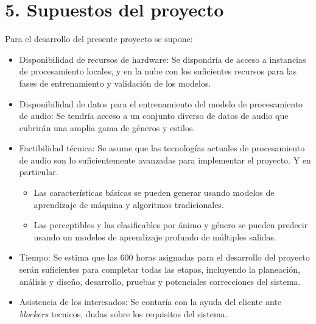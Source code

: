\documentclass[
11pt, %
]{charter}
\begin{document}
\section{5. Supuestos del proyecto}
\label{sec:supuestos}

Para el desarrollo del presente proyecto se supone:

\begin{itemize}
	\item Disponibilidad de recursos de hardware: Se dispondría de acceso a instancias de procesamiento locales, y en la nube con los suficientes recursos para las fases de entrenamiento y validación de los modelos.
	\item Disponibilidad de datos para el entrenamiento del modelo de procesamiento de audio: Se tendría acceso a un conjunto diverso de datos de audio que cubrirán una amplia gama de géneros y estilos.
	\item Factibilidad técnica: Se asume que las tecnologías actuales de procesamiento de audio son lo suficientemente avanzadas para implementar el proyecto. Y en particular.
  \begin{itemize}  
    \item Las características básicas se pueden generar usando modelos de aprendizaje de máquina y algoritmos tradicionales.
    \item Las perceptibles y las clasificables por ánimo y género se pueden predecir usando un modelos de aprendizaje profundo de múltiples salidas.
  \end{itemize}    
  \item Tiempo: Se estima que las 600 horas asignadas para el desarrollo del proyecto serán suficientes para completar todas las etapas, incluyendo la planeación, análisis y diseño, desarrollo, pruebas y potenciales correcciones del sistema.
  \item Asistencia de los interesados: Se contaría con la ayuda del cliente ante \textit{blockers} tecnicos, dudas sobre los requisitos del sistema.
\end{itemize}

\end{document}
